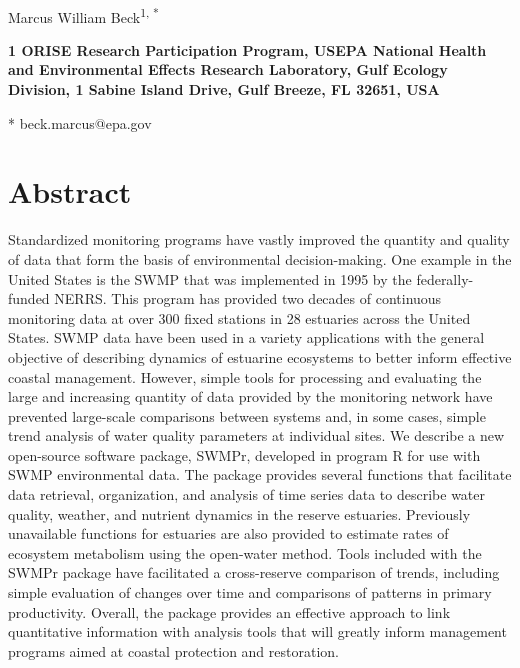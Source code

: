 \documentclass[10pt,letterpaper]{article}\usepackage[]{graphicx}\usepackage[]{color}
\date{}
\begin{document}
\vspace*{0.35in}

\begin{flushleft}
{\Large
\textbf{}
}
\newline
\\
Marcus William Beck\textsuperscript{1, *}

\bigskip
\bf{1} ORISE Research Participation Program, USEPA National Health and Environmental Effects Research Laboratory, Gulf Ecology Division, 1 Sabine Island Drive, Gulf Breeze, FL 32651, USA
\\
\bigskip

* beck.marcus@epa.gov

\end{flushleft}
\section*{Abstract}
Standardized monitoring programs have vastly improved the quantity and quality of data that form the basis of environmental decision-making.  One example in the United States is the \ac{SWMP} that was implemented in 1995 by the federally-funded \ac{NERRS}.  This program has provided two decades of continuous monitoring data at over 300 fixed stations in 28 estuaries across the United States.  \ac{SWMP} data have been used in a variety applications with the general objective of describing dynamics of estuarine ecosystems to better inform effective coastal management.  However, simple tools for processing and evaluating the large and increasing quantity of data provided by the monitoring network have prevented large-scale comparisons between systems and, in some cases, simple trend analysis of water quality parameters at individual sites.  We describe a new open-source software package, SWMPr, developed in program R for use with \ac{SWMP} environmental data.  The package provides several functions that facilitate data retrieval, organization, and analysis of time series data to describe water quality, weather, and nutrient dynamics in the reserve estuaries.  Previously unavailable functions for estuaries are also provided to estimate rates of ecosystem metabolism using the open-water method.  Tools included with the SWMPr package have facilitated a cross-reserve comparison of trends, including simple evaluation of changes over time and comparisons of patterns in primary productivity.  Overall, the package provides an effective approach to link quantitative information with analysis tools that will greatly inform management programs aimed at coastal protection and restoration.
\end{document}
